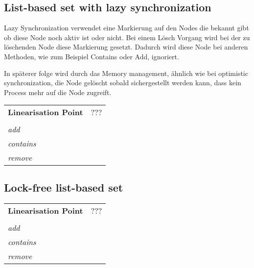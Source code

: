 \subsection{List-based set with lazy synchronization}

Lazy Synchronization verwendet eine Markierung auf den Nodes die bekannt gibt ob diese Node noch aktiv ist oder nicht. Bei einem Lösch Vorgang wird bei der zu löschenden Node diese Markierung gesetzt. Dadurch wird diese Node bei anderen Methoden, wie zum Beispiel Contains oder Add, ignoriert. 

In späterer folge wird durch das Memory management, ähnlich wie bei optimistic synchronization, die Node gelöscht sobald sichergestellt werden kann, dass kein Process mehr auf die Node zugreift.

\begin{table}[H]
    \begin{tabularx}{\textwidth}{lX}
        \textbf{Linearisation Point} & ???\\
        \\
        \textit{add} & \\
        \textit{contains} & \\
        \textit{remove} & \\
    \end{tabularx}
\end{table}

\subsection{Lock-free list-based set}

\begin{table}[H]
    \begin{tabularx}{\textwidth}{lX}
        \textbf{Linearisation Point} & ???\\
        \\
        \textit{add} & \\
        \textit{contains} & \\
        \textit{remove} & \\
    \end{tabularx}
\end{table}